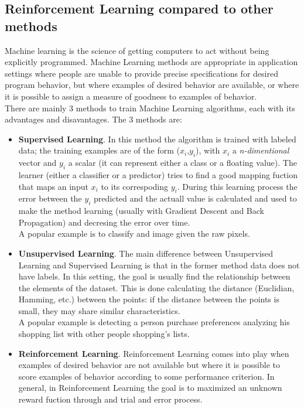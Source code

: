 \documentclass[14pt]{extarticle}
\begin{document}
\begin{flushleft}
\subsection{Reinforcement Learning compared to other methods}
Machine learning is the science of getting computers to act without being explicitly programmed. Machine Learning methods are appropriate in application settings where
people are unable to provide precise specifications for desired program behavior, but
where examples of desired behavior are available, or where it is possible to assign a
measure of goodness to examples of behavior\cite{RLandSL}.
\\
There are mainly 3 methods to train Machine Learning algorithms, each with its advantages and disavantages. The 3 methods are:
\begin{itemize}
\item \textbf{Supervised Learning}. In this method the algorithm is trained with labeled data; the training examples are of the form ($x_i$,$y_i$), with $x_i$ a \emph{n-dimentional} vector and $y_i$ a scalar (it can represent either a class or a floating value). The learner (either a classifier or a predictor) tries to find a good mapping fuction that maps an input $x_i$ to its correspoding $y_i$. During this learning process the error between the $y_i$ predicted and the actuall value is calculated and used to make the method learning (usually with Gradient Descent and Back Propagation) and decresing the error over time. \\
A popular example is to classify and image given the raw pixels.
\item \textbf{Unsupervised Learning}. The main difference between Unsupervised Learning and Supervised Learning is that in the former method data does not have labels. In this setting, the goal is usually find the relationship between the elements of the dataset. This is done calculating the distance (Euclidian, Hamming, etc.) between the points: if the distance between the points is small, they may share similar characteristics. \\
A popular example is detecting a person purchase preferences analyzing his shopping list with other people shopping's lists.
\item \textbf{Reinforcement Learning}. Reinforcement Learning comes into play when examples of desired behavior are not available but where it is possible to score examples of behavior according to some performance criterion\cite{RLandSL}. In general, in Reinforcement Learning the goal is to maximized an unknown reward fuction through and trial and error process. \\

\end{itemize}
\end{flushleft}
\end{document}
